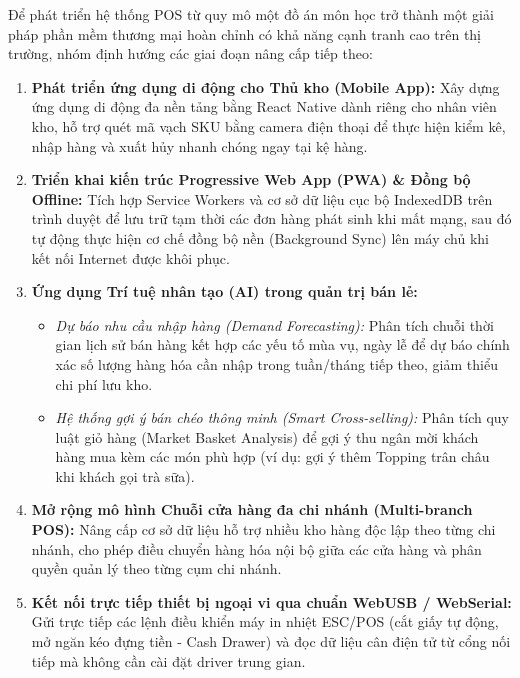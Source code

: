 Để phát triển hệ thống POS từ quy mô một đồ án môn học trở thành một giải pháp phần mềm thương mại hoàn chỉnh có khả năng cạnh tranh cao trên thị trường, nhóm định hướng các giai đoạn nâng cấp tiếp theo:
\begin{enumerate}[label=\arabic*., leftmargin=1.5cm]
    \item \textbf{Phát triển ứng dụng di động cho Thủ kho (Mobile App):} Xây dựng ứng dụng di động đa nền tảng bằng React Native dành riêng cho nhân viên kho, hỗ trợ quét mã vạch SKU bằng camera điện thoại để thực hiện kiểm kê, nhập hàng và xuất hủy nhanh chóng ngay tại kệ hàng.
    \item \textbf{Triển khai kiến trúc Progressive Web App (PWA) \& Đồng bộ Offline:} Tích hợp Service Workers và cơ sở dữ liệu cục bộ IndexedDB trên trình duyệt để lưu trữ tạm thời các đơn hàng phát sinh khi mất mạng, sau đó tự động thực hiện cơ chế đồng bộ nền (Background Sync) lên máy chủ khi kết nối Internet được khôi phục.
    \item \textbf{Ứng dụng Trí tuệ nhân tạo (AI) trong quản trị bán lẻ:}
    \begin{itemize}
        \item \textit{Dự báo nhu cầu nhập hàng (Demand Forecasting):} Phân tích chuỗi thời gian lịch sử bán hàng kết hợp các yếu tố mùa vụ, ngày lễ để dự báo chính xác số lượng hàng hóa cần nhập trong tuần/tháng tiếp theo, giảm thiểu chi phí lưu kho.
        \item \textit{Hệ thống gợi ý bán chéo thông minh (Smart Cross-selling):} Phân tích quy luật giỏ hàng (Market Basket Analysis) để gợi ý thu ngân mời khách hàng mua kèm các món phù hợp (ví dụ: gợi ý thêm Topping trân châu khi khách gọi trà sữa).
    \end{itemize}
    \item \textbf{Mở rộng mô hình Chuỗi cửa hàng đa chi nhánh (Multi-branch POS):} Nâng cấp cơ sở dữ liệu hỗ trợ nhiều kho hàng độc lập theo từng chi nhánh, cho phép điều chuyển hàng hóa nội bộ giữa các cửa hàng và phân quyền quản lý theo từng cụm chi nhánh.
    \item \textbf{Kết nối trực tiếp thiết bị ngoại vi qua chuẩn WebUSB / WebSerial:} Gửi trực tiếp các lệnh điều khiển máy in nhiệt ESC/POS (cắt giấy tự động, mở ngăn kéo đựng tiền - Cash Drawer) và đọc dữ liệu cân điện tử từ cổng nối tiếp mà không cần cài đặt driver trung gian.
\end{enumerate}

